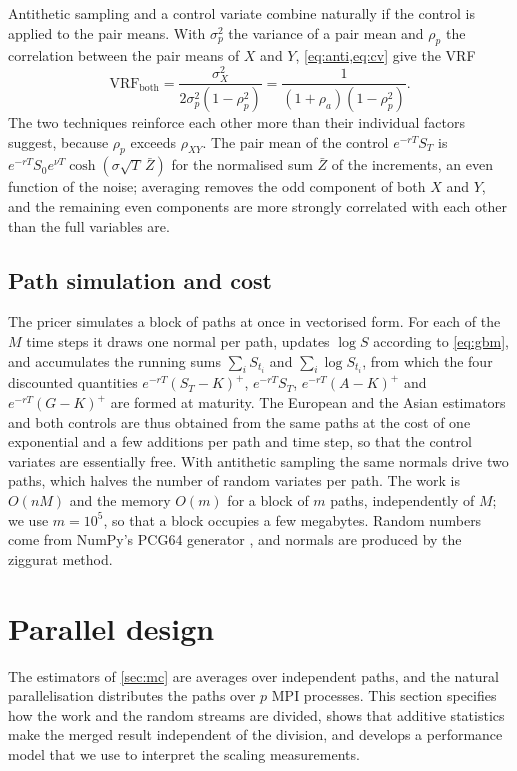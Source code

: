 \documentclass[11pt,a4paper]{article}
\begin{document}
Antithetic sampling and a control variate combine naturally if the control is applied to the pair means.
With $\sigma_p^2$ the variance of a pair mean and $\rho_p$ the correlation between the pair means of $X$ and $Y$, \cref{eq:anti,eq:cv} give the VRF
\begin{equation}\label{eq:both}
\mathrm{VRF}_{\mathrm{both}} = \frac{\sigma_X^2}{2\sigma_p^2(1-\rho_p^2)} = \frac{1}{(1+\rho_a)(1-\rho_p^2)} .
\end{equation}
The two techniques reinforce each other more than their individual factors suggest, because $\rho_p$ exceeds $\rho_{XY}$.
The pair mean of the control $e^{-rT}S_T$ is $e^{-rT}S_0e^{\nu T}\cosh(\sigma\sqrt T\,\bar Z)$ for the normalised sum $\bar Z$ of the increments, an even function of the noise; averaging removes the odd component of both $X$ and $Y$, and the remaining even components are more strongly correlated with each other than the full variables are.

\subsection{Path simulation and cost}\label{sec:sim}

The pricer simulates a block of paths at once in vectorised form.
For each of the $M$ time steps it draws one normal per path, updates $\log S$ according to \cref{eq:gbm}, and accumulates the running sums $\sum_i S_{t_i}$ and $\sum_i \log S_{t_i}$, from which the four discounted quantities $e^{-rT}(S_T-K)^+$, $e^{-rT}S_T$, $e^{-rT}(A-K)^+$ and $e^{-rT}(G-K)^+$ are formed at maturity.
The European and the Asian estimators and both controls are thus obtained from the same paths at the cost of one exponential and a few additions per path and time step, so that the control variates are essentially free.
With antithetic sampling the same normals drive two paths, which halves the number of random variates per path.
The work is $O(nM)$ and the memory $O(m)$ for a block of $m$ paths, independently of $M$; we use $m=10^5$, so that a block occupies a few megabytes.
Random numbers come from NumPy's PCG64 generator \citep{oneill2014}, and normals are produced by the ziggurat method.

\section{Parallel design}\label{sec:mpi}

The estimators of \cref{sec:mc} are averages over independent paths, and the natural parallelisation distributes the paths over $p$ MPI processes.
This section specifies how the work and the random streams are divided, shows that additive statistics make the merged result independent of the division, and develops a performance model that we use to interpret the scaling measurements.
\end{document}
